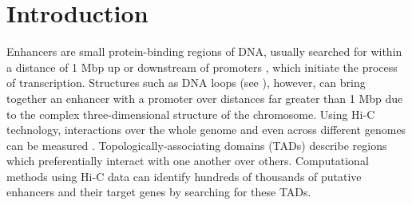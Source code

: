 \chapter{Introduction}\label{chap:introduction}

%
%
%
%
%
%



Enhancers are
small protein-binding regions of DNA,
usually searched for within a distance of 1 Mbp up or downstream
of promoters \cite{pennacchio2013enhancers},
which initiate the process of transcription.
Structures such as DNA loops (see
), however, can bring together an enhancer with a promoter
over distances far greater than 1 Mbp\cite{pennacchio2013enhancers}
due to the complex three-dimensional structure of the chromosome.
Using Hi-C technology, interactions over the whole genome \cite{lieberman2009comprehensive} and
even across different genomes can be measured \cite{rao20143d}.
Topologically-associating domains (TADs) describe regions which preferentially
interact with one another over others. Computational methods
using Hi-C data can identify hundreds of thousands of putative enhancers and their target genes by
searching for these TADs\cite{ron2017promoter}.

